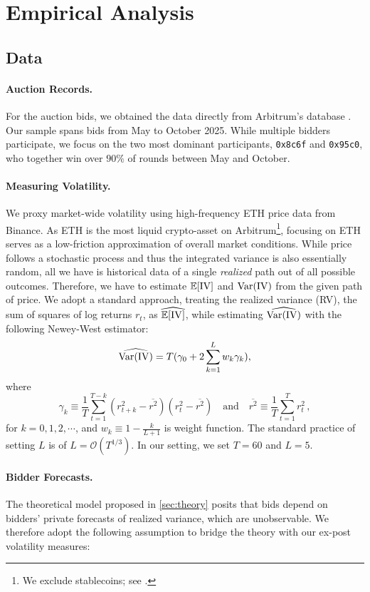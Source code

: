 \section{Empirical Analysis}

\subsection{Data}
\paragraph*{Auction Records.} For the auction bids, we obtained the data directly from Arbitrum's database \cite{offchainlabs2025howtousetimeboost}. Our sample spans bids from May to October 2025. While multiple bidders participate, we focus on the two most dominant participants, \texttt{0x8c6f} and \texttt{0x95c0}, who together win over $90\%$ of rounds between May and October. 

\paragraph*{Measuring Volatility.} We proxy market-wide volatility using high-frequency ETH price data from Binance. As ETH is the most liquid crypto-asset on Arbitrum\footnote{We exclude stablecoins; see \cite{l2beat}.}, focusing on ETH serves as a low-friction approximation of overall market conditions. While price follows a stochastic process and thus the integrated variance is also essentially random, all we have is historical data of a single \emph{realized} path out of all possible outcomes. Therefore, we have to estimate $\mathbb{E}[\mathrm{IV}]$ and $\mathrm{Var}(\mathrm{IV})$ from the given path of price. We adopt a standard approach, treating the realized variance (RV), the sum of squares of log returns $r_t$, as $\widehat{\mathbb{E}[\mathrm{IV}]}$, while estimating $\widehat{\mathrm{Var}(\mathrm{IV})}$ with the following Newey-West estimator: \[
\widehat{\mathrm{Var}(\mathrm{IV})} = T (\gamma_0 + 2\sum_{k=1}^L w_k \gamma_k),
\] where \[
\gamma_k \equiv \frac{1}{T} \sum_{t=1}^{T - k} (r^2_{t + k} - \overline{r^2})(r^2_t - \overline{r^2}) \quad \text{and} \quad \overline{r^2} \equiv \frac{1}{T} \sum_{t=1}^T r_t^2\, ,
\] for $k = 0, 1, 2, \cdots$, and $w_k \equiv 1 - \frac{k}{L + 1}$ is weight function. The standard practice of setting \(L \) is of \( L = \mathcal O(T^{1/3})\). In our setting, we set $T = 60$ and $L = 5$.

\paragraph*{Bidder Forecasts.} The theoretical model proposed in \cref{sec:theory} posits that bids depend on bidders' private forecasts of realized variance, which are unobservable. We therefore adopt the following assumption to bridge the theory with our ex-post volatility measures:

